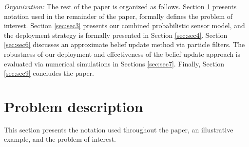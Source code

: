 \documentclass[letterpaper, 10 pt, conference]{ieeeconf}
\begin{document}
\textit{Organization:}
The rest of the paper is organized as follows. 
Section \ref{sec:sec2} presents notation used in the remainder of the paper, formally defines the problem of interest.
Section \ref{sec:sec3} presents our combined probabilistic sensor model, and the deployment strategy is formally presented in Section \ref{sec:sec4}. 
Section \ref{sec:sec6} discusses an approximate belief update method via particle filters. 
The robustness of our deployment and effectiveness of the belief update approach is evaluated via numerical simulations in Sections \ref{sec:sec7}. Finally, Section \ref{sec:sec9} concludes the paper.

%




\section{Problem description}
\label{sec:sec2}

This section presents the notation used throughout the paper, an illustrative example, and the problem of interest.
\end{document}
